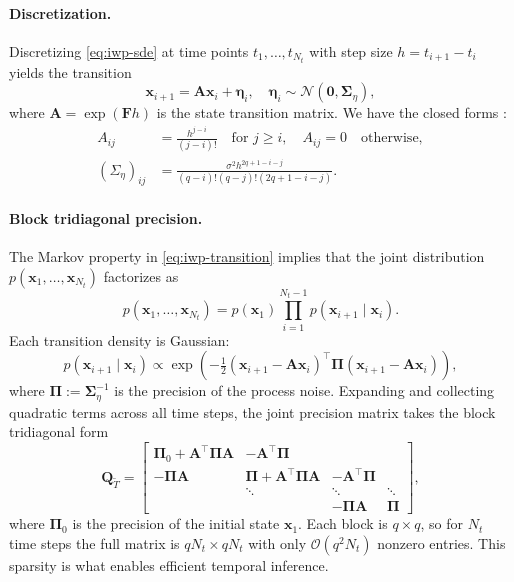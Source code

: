 \documentclass{article}
\theoremstyle{plain}
\theoremstyle{definition}
\theoremstyle{remark}
\newcommand{\Normal}{\mathcal{N}}
\begin{document}
\paragraph{Discretization.}
Discretizing \cref{eq:iwp-sde} at time points $t_1, \ldots, t_{N_t}$ with step size $h = t_{i+1} - t_i$ yields the transition
\begin{equation}
  \bm{x}_{i+1} = \bm{A} \bm{x}_i + \bm{\eta}_i, \quad \bm{\eta}_i \sim \Normal(\bm{0}, \bm{\Sigma}_\eta),
  \label{eq:iwp-transition}
\end{equation}
where $\bm{A} = \exp(\bm{F} h)$ is the state transition matrix.
We have the closed forms \citep{schoberProbabilisticModelNumerical2019}:
\begin{align}
  A_{ij}             & = \frac{h^{j-i}}{(j-i)!} \quad \text{for } j \geq i, \quad A_{ij} = 0 \quad \text{otherwise}, \\
  (\Sigma_\eta)_{ij} & = \frac{\sigma^2 h^{2q+1-i-j}}{(q-i)!(q-j)!(2q+1-i-j)}.
\end{align}

\paragraph{Block tridiagonal precision.}
The Markov property in \cref{eq:iwp-transition} implies that the joint distribution $p(\bm{x}_1, \ldots, \bm{x}_{N_t})$ factorizes as
\begin{equation}
  p(\bm{x}_1, \ldots, \bm{x}_{N_t}) = p(\bm{x}_1) \prod_{i=1}^{N_t - 1} p(\bm{x}_{i+1} \mid \bm{x}_i).
\end{equation}
Each transition density is Gaussian:
\begin{equation}
  p(\bm{x}_{i+1} \mid \bm{x}_i) \propto \exp\!\left( -\tfrac{1}{2} (\bm{x}_{i+1} - \bm{A} \bm{x}_i)^\top \bm{\Pi} (\bm{x}_{i+1} - \bm{A} \bm{x}_i) \right),
\end{equation}
where $\bm{\Pi} := \bm{\Sigma}_\eta^{-1}$ is the precision of the process noise.
Expanding and collecting quadratic terms across all time steps, the joint precision matrix takes the block tridiagonal form
\begin{equation}
  \bm{Q}_{\tilde{T}} = \begin{bmatrix}
    \bm{\Pi}_0 + \bm{A}^\top \bm{\Pi} \bm{A} & -\bm{A}^\top \bm{\Pi}                  &                       &          \\
    -\bm{\Pi} \bm{A}                         & \bm{\Pi} + \bm{A}^\top \bm{\Pi} \bm{A} & -\bm{A}^\top \bm{\Pi} &          \\
                                             & \ddots                                 & \ddots                & \ddots   \\
                                             &                                        & -\bm{\Pi} \bm{A}      & \bm{\Pi}
  \end{bmatrix},
  \label{eq:iwp-precision}
\end{equation}
where $\bm{\Pi}_0$ is the precision of the initial state $\bm{x}_1$.
Each block is $q \times q$, so for $N_t$ time steps the full matrix is $q N_t \times q N_t$ with only $\mathcal{O}(q^2 N_t)$ nonzero entries.
This sparsity is what enables efficient temporal inference.
\end{document}
